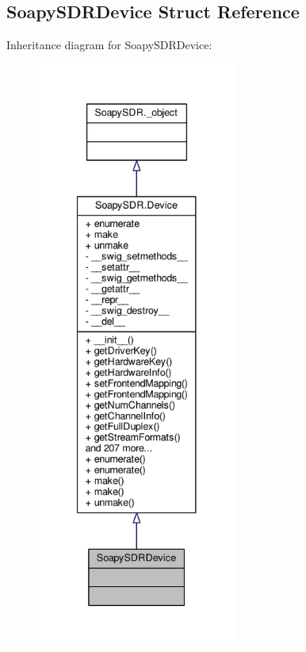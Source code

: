\subsection{Soapy\+S\+D\+R\+Device Struct Reference}
\label{structSoapySDRDevice}


Inheritance diagram for Soapy\+S\+D\+R\+Device\+:
\nopagebreak
\begin{figure}[H]
\begin{center}
\leavevmode
\includegraphics[height=550pt]{d9/d75/structSoapySDRDevice__inherit__graph}
\end{center}
\end{figure}



